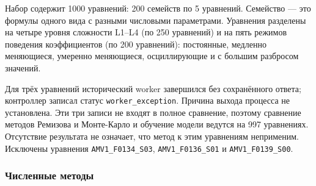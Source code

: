 \documentclass[14pt,a4paper]{extarticle}
\newcommand{\code}[1]{\texttt{#1}}
\begin{document}
Набор содержит 1000 уравнений: 200 семейств по 5 уравнений. Семейство ---
это формулы одного вида с разными числовыми параметрами. Уравнения
разделены на четыре уровня сложности L1--L4 (по 250 уравнений) и на пять
режимов поведения коэффициентов (по 200 уравнений): постоянные, медленно
меняющиеся, умеренно меняющиеся, осциллирующие и с большим разбросом
значений.

Для трёх уравнений исторический worker завершился без сохранённого
ответа; контроллер записал статус \code{worker\_exception}. Причина
выхода процесса не установлена. Эти три записи не входят в полное
сравнение, поэтому сравнение
методов Ремизова и Монте-Карло и обучение модели ведутся
на 997 уравнениях. Отсутствие результата не означает, что метод к этим
уравнениям неприменим. Исключены уравнения
\texttt{AMV1\_F0134\_S03}, \texttt{AMV1\_F0136\_S01}
и \texttt{AMV1\_F0139\_S00}.

\subsubsection{Численные методы}\label{sec:ml-methods}
\end{document}
